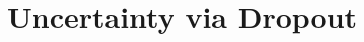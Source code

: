 \documentclass[DIN, pagenumber=false, fontsize=11pt, parskip=half]{scrartcl}
\begin{document}
    \section{Uncertainty via Dropout}
    \subsection{}
    
\end{document}
